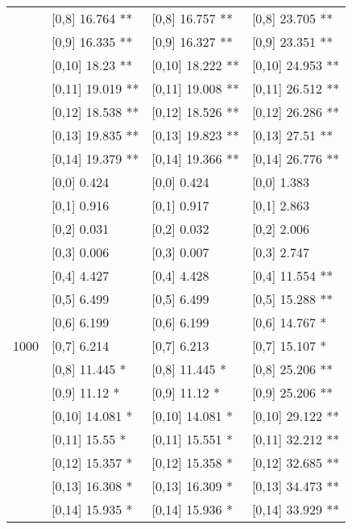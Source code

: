 \begin{table}
\begin{tabular}[t]{llll}
 & {}[0,8] 16.764 ** & {}[0,8] 16.757 ** & {}[0,8] 23.705 **\\
 & {}[0,9] 16.335 ** & {}[0,9] 16.327 ** & {}[0,9] 23.351 **\\
\addlinespace
 & {}[0,10] 18.23 ** & {}[0,10] 18.222 ** & {}[0,10] 24.953 **\\
 & {}[0,11] 19.019 ** & {}[0,11] 19.008 ** & {}[0,11] 26.512 **\\
 & {}[0,12] 18.538 ** & {}[0,12] 18.526 ** & {}[0,12] 26.286 **\\
 & {}[0,13] 19.835 ** & {}[0,13] 19.823 ** & {}[0,13] 27.51 **\\
 & {}[0,14] 19.379 ** & {}[0,14] 19.366 ** & {}[0,14] 26.776 **\\
\addlinespace
 & {}[0,0] 0.424 & {}[0,0] 0.424 & {}[0,0] 1.383\\
 & {}[0,1] 0.916 & {}[0,1] 0.917 & {}[0,1] 2.863\\
 & {}[0,2] 0.031 & {}[0,2] 0.032 & {}[0,2] 2.006\\
 & {}[0,3] 0.006 & {}[0,3] 0.007 & {}[0,3] 2.747\\
 & {}[0,4] 4.427 & {}[0,4] 4.428 & {}[0,4] 11.554 **\\
\addlinespace
 & {}[0,5] 6.499 & {}[0,5] 6.499 & {}[0,5] 15.288 **\\
 & {}[0,6] 6.199 & {}[0,6] 6.199 & {}[0,6] 14.767 *\\
1000 & {}[0,7] 6.214 & {}[0,7] 6.213 & {}[0,7] 15.107 *\\
 & {}[0,8] 11.445 * & {}[0,8] 11.445 * & {}[0,8] 25.206 **\\
 & {}[0,9] 11.12 * & {}[0,9] 11.12 * & {}[0,9] 25.206 **\\
\addlinespace
 & {}[0,10] 14.081 * & {}[0,10] 14.081 * & {}[0,10] 29.122 **\\
 & {}[0,11] 15.55 * & {}[0,11] 15.551 * & {}[0,11] 32.212 **\\
 & {}[0,12] 15.357 * & {}[0,12] 15.358 * & {}[0,12] 32.685 **\\
 & {}[0,13] 16.308 * & {}[0,13] 16.309 * & {}[0,13] 34.473 **\\
 & {}[0,14] 15.935 * & {}[0,14] 15.936 * & {}[0,14] 33.929 **\\
\bottomrule
\end{tabular}
\end{table}
